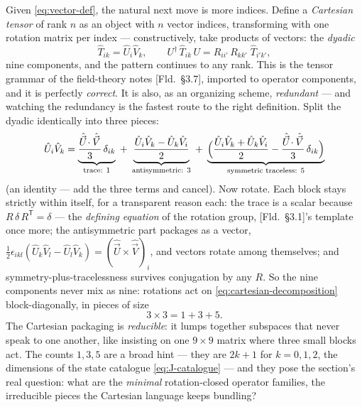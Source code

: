 \documentclass[11pt]{article}
\theoremstyle{plain}
\theoremstyle{definition}
\theoremstyle{remark}
\newcommand{\op}[1]{\hat{#1}}
\begin{document}
Given \eqref{eq:vector-def}, the natural next move is more indices.
Define a \emph{Cartesian tensor} of rank $n$ as an object with $n$
vector indices, transforming with one rotation matrix per index ---
constructively, take products of vectors: the \emph{dyadic}
\begin{equation}
  \op T_{ik} = \op U_i \op V_k,
  \qquad
  U^\dagger\,\op T_{ik}\,U
  = R_{ii'}\,R_{kk'}\;\op T_{i'k'},
  \label{eq:dyadic}
\end{equation}
nine components, and the pattern continues to any rank. This is the
tensor grammar of the field-theory notes [Fld.\ \S3.7], imported to
operator components, and it is perfectly \emph{correct}. It is
also, as an organizing scheme, \emph{redundant} --- and watching
the redundancy is the fastest route to the right definition. Split
the dyadic identically into three pieces:
\begin{equation}
  \op U_i \op V_k
  = \underbrace{\frac{\op{\vec U}\!\cdot\op{\vec V}}{3}\,
    \delta_{ik}}_{\text{trace: } 1}
  \;+\;
  \underbrace{\frac{\op U_i \op V_k - \op U_k \op V_i}{2}}_{%
    \text{antisymmetric: } 3}
  \;+\;
  \underbrace{\Bigl(
    \frac{\op U_i \op V_k + \op U_k \op V_i}{2}
    - \frac{\op{\vec U}\!\cdot\op{\vec V}}{3}\,\delta_{ik}
  \Bigr)}_{\text{symmetric traceless: } 5}
  \label{eq:cartesian-decomposition}
\end{equation}
(an identity --- add the three terms and cancel). Now rotate. Each
block stays strictly within itself, for a transparent reason each:
the trace is a scalar because $R\,\delta\,R^{\mathsf T} = \delta$
--- the \emph{defining equation} of the rotation group, [Fld.\
\S3.1]'s template once more; the antisymmetric part packages as a
vector, $\tfrac12\epsilon_{ikl}(\op U_k\op V_l - \op U_l\op V_k) =
(\op{\vec U}\times\op{\vec V})_i$, and vectors rotate among
themselves; and symmetry-plus-tracelessness survives conjugation by
any $R$. So the nine components never mix as nine: rotations act on
\eqref{eq:cartesian-decomposition} block-diagonally, in pieces of
size
\begin{equation}
  3 \times 3 = 1 + 3 + 5 .
  \label{eq:one-three-five}
\end{equation}
The Cartesian packaging is \emph{reducible}: it lumps together
subspaces that never speak to one another, like insisting on one
$9\times9$ matrix where three small blocks act. The counts $1, 3,
5$ are a broad hint --- they are $2k + 1$ for $k = 0, 1, 2$, the
dimensions of the state catalogue \eqref{eq:J-catalogue} --- and
they pose the section's real question: what are the \emph{minimal}
rotation-closed operator families, the irreducible pieces the
Cartesian language keeps bundling?
\end{document}
